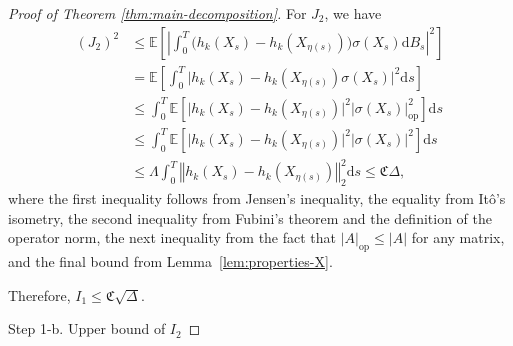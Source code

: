 \documentclass{article}
\theoremstyle{plain}
\theoremstyle{definition}
\theoremstyle{remark}
\renewcommand{\d}{\mathrm{d}}
\newcommand{\EE}{\mathbb{E}}
\newcommand{\rr}{\color{red}}
\newcommand{\black}{\color{black}}
\begin{document}
\begin{proof}[Proof of Theorem \ref{thm:main-decomposition}]
For $J_2$, we have  %
\begin{align}
(J_2)^2&\leq \EE \left[\left|\int_0^T \big( h_k(X_s)-h_k(X_{\eta(s)})\big) \sigma (X_s)\d B_s\right|^2\right]\nonumber\\
&= \EE \left[\int_0^T \big| h_k(X_s)-h_k(X_{\eta(s)})\sigma (X_s)\big|^2\d s\right]\nonumber\\
&\leq \int_0^T \EE \left[\big| h_k(X_s)-h_k(X_{\eta(s)})\big|^2|\sigma(X_s)|^2_{\text{op}}\right]\d s \nonumber\\
&\leq  \int_0^T \EE \left[\big| h_k(X_s)-h_k(X_{\eta(s)})\big|^2|\sigma(X_s)|^2\right]\d s \nonumber\\
&\leq \Lambda\int_0^T \left\Vert h_k(X_s)-h_k(X_{\eta(s)})\right\Vert_2^2 \d s\leq \mathfrak{C} \Delta,
\end{align}
where the first inequality follows from Jensen’s inequality, the equality from Itô’s isometry, the second inequality from Fubini’s theorem and the definition of the operator norm, the next inequality from the fact that $|A|_{\text{op}}\leq |A|$ for any matrix, and the final bound from Lemma~\ref{lem:properties-X}.

Therefore, $I_1\leq \mathfrak{C}\sqrt{\Delta}$. 

{\sc Step 1-b. Upper bound of $I_2$}



\end{proof}
\end{document}
